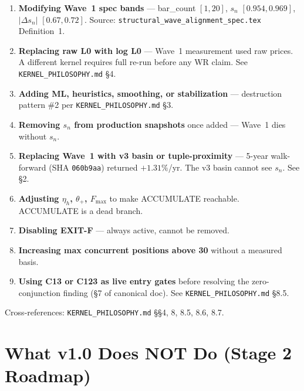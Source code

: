 \documentclass[11pt,a4paper]{article}
\newcommand{\sha}[1]{\texttt{\footnotesize#1}}
\begin{document}
\begin{enumerate}
  \item \textbf{Modifying Wave~1 spec bands} — bar\_count $[1,20]$, $s_n$ $[0.954,0.969]$, $|\Delta s_n|$ $[0.67,0.72]$. Source: \texttt{structural\_wave\_alignment\_spec.tex} Definition~1.
  \item \textbf{Replacing raw L0 with log L0} — Wave~1 measurement used raw prices. A different kernel requires full re-run before any WR claim. See \texttt{KERNEL\_PHILOSOPHY.md} §4.
  \item \textbf{Adding ML, heuristics, smoothing, or stabilization} — destruction pattern \#2 per \texttt{KERNEL\_PHILOSOPHY.md} §3.
  \item \textbf{Removing $s_n$ from production snapshots} once added — Wave~1 dies without $s_n$.
  \item \textbf{Replacing Wave~1 with v3 basin or tuple-proximity} — 5-year walk-forward (SHA \sha{060b9aa}) returned $+1.31\%$/yr. The v3 basin cannot see $s_n$. See §2.
  \item \textbf{Adjusting $\eta_h$, $\theta_+$, $F_{\max}$} to make ACCUMULATE reachable. ACCUMULATE is a dead branch.
  \item \textbf{Disabling EXIT-F} — always active, cannot be removed.
  \item \textbf{Increasing max concurrent positions above 30} without a measured basis.
  \item \textbf{Using C13 or C123 as live entry gates} before resolving the zero-conjunction finding (§7 of canonical doc). See \texttt{KERNEL\_PHILOSOPHY.md} §8.5.
\end{enumerate}

Cross-references: \texttt{KERNEL\_PHILOSOPHY.md} §§4, 8, 8.5, 8.6, 8.7.

\section{What v1.0 Does NOT Do (Stage 2 Roadmap)}
\label{sec:stage2}
\end{document}
